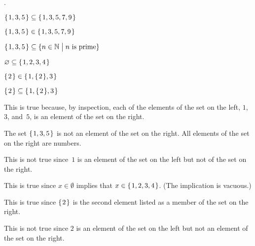 \documentclass{ibl}
\begin{document}
\begin{ex} \pord.
\begin{exes}
\item $\mbox{$\{\hspace{0.1em}1,3,5\hspace{0.1em}\}$}\subseteq\mbox{$\{\hspace{0.1em}1,3, 5, 7, 9\hspace{0.1em}\}$}$
\item $\mbox{$\{\hspace{0.1em}1, 3, 5\hspace{0.1em}\}$}\in\mbox{$\{\hspace{0.1em}1, 3, 5, 7, 9\hspace{0.1em}\}$}$   
\item $\mbox{$\{\hspace{0.1em}1,3,5\hspace{0.1em}\}$}\subseteq\{n\in\mathbb{N} \bigm| \text{$n$ is prime}\}$
\item $\varnothing\subseteq\mbox{$\{\hspace{0.1em}1, 2, 3, 4\hspace{0.1em}\}$}$
\item $\mbox{$\{\hspace{0.1em}2\hspace{0.1em}\}$}\in\mbox{$\{\hspace{0.1em}1, \mbox{$\{\hspace{0.1em}2\hspace{0.1em}\}$}, 3\hspace{0.1em}\}$}$
\item $\mbox{$\{\hspace{0.1em}2\hspace{0.1em}\}$}\subseteq\mbox{$\{\hspace{0.1em}1, \mbox{$\{\hspace{0.1em}2\hspace{0.1em}\}$}, 3\hspace{0.1em}\}$}$
\end{exes}
\begin{ans}
\begin{exes}
\item This is true because, by inspection, each of the elements of the set
  on the left, $1$, $3$, and~$5$, is an element of the set on the right.
\item The set $\mbox{$\{\hspace{0.1em}1,3,5\hspace{0.1em}\}$}$ is not an element of the set on the right.
  All elements of the set on the right are numbers.
\item This is not true since~$1$ is an element of the set on the left
  but not of the set on the right.
\item This is true since $x\in\emptyset$ implies that $x\in\mbox{$\{\hspace{0.1em}1, 2, 3, 4\hspace{0.1em}\}$}$. 
  (The implication is vacuous.)
\item This is true since $\mbox{$\{\hspace{0.1em}2\hspace{0.1em}\}$}$ is the second element listed as a
  member of the set on the right.
\item This is not true since $2$ is an element of the set on the left but
  not an element of the set on the right.
\end{exes}
\end{ans}
\end{ex}
\end{document}
